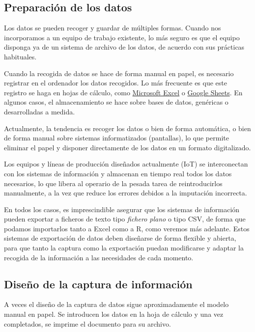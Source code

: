 \documentclass[
  letterpaper,
  DIV=11,
  numbers=noendperiod,
  oneside]{scrreprt}
\begin{document}
\hypertarget{preparaciuxf3n-de-los-datos}{%
\subsection{Preparación de los
datos}\label{preparaciuxf3n-de-los-datos}}

Los datos se pueden recoger y guardar de múltiples formas. Cuando nos
incorporamos a un equipo de trabajo existente, lo más seguro es que el
equipo disponga ya de un sistema de archivo de los datos, de acuerdo con
sus prácticas habituales.

Cuando la recogida de datos se hace de forma manual en papel, es
necesario registrar en el ordenador los datos recogidos. Lo más
frecuente es que este registro se haga en hojas de cálculo, como
\href{https://www.microsoft.com/es-es/microsoft-365/excel}{Microsoft
Excel} o \href{https://www.google.es/intl/es/sheets/about/}{Google
Sheets}. En algunos casos, el almacenamiento se hace sobre bases de
datos, genéricas o desarrolladas a medida.

Actualmente, la tendencia es recoger los datos o bien de forma
automática, o bien de forma manual sobre sistemas informatizados
(pantallas), lo que permite eliminar el papel y disponer directamente de
los datos en un formato digitalizado.

Los equipos y líneas de producción diseñados actualmente (IoT) se
interconectan con los sistemas de información y almacenan en tiempo real
todos los datos necesarios, lo que libera al operario de la pesada tarea
de reintroducirlos manualmente, a la vez que reduce los errores debidos
a la imputación incorrecta.

En todos los casos, es imprescindible asegurar que los sistemas de
información pueden exportar a ficheros de texto tipo \emph{fichero
plano} o tipo CSV, de forma que podamos importarlos tanto a Excel como a
R, como veremos más adelante. Estos sistemas de exportación de datos
deben diseñarse de forma flexible y abierta, para que tanto la captura
como la exportación puedan modificarse y adaptar la recogida de la
información a las necesidades de cada momento.

\hypertarget{diseuxf1o-de-la-captura-de-informaciuxf3n}{%
\subsection{Diseño de la captura de
información}\label{diseuxf1o-de-la-captura-de-informaciuxf3n}}

A veces el diseño de la captura de datos sigue aproximadamente el modelo
manual en papel. Se introducen los datos en la hoja de cálculo y una vez
completados, se imprime el documento para su archivo.
\end{document}
